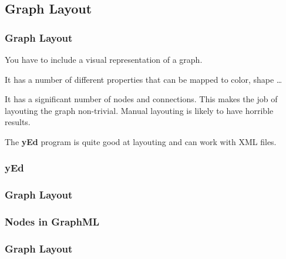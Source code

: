 {\subsection{Graph Layout}
\begin{frame}[fragile]
  \frametitle{Graph Layout}
  \vspace{3mm}
  You have to include a visual representation of a graph.
  
  \vspace{5mm}
  It has a number of different properties that can be mapped to color, shape \ldots
  
  \vspace{5mm}
  It has a significant number of nodes and connections. This makes the job of layouting the graph non-trivial. Manual layouting is likely to have horrible results.
  
  \vspace{5mm}
  The \textbf{yEd} program is quite good at layouting and can work with XML files.
\end{frame}

\subsubsection{yEd}
\begin{frame}[fragile]
  \frametitle{Graph Layout }
  
\end{frame}

\subsubsection{Nodes in GraphML}
\begin{frame}[fragile]
  \frametitle{Graph Layout }
  \vspace{-2mm}
  

\end{frame}}
